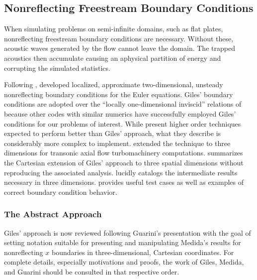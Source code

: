 \subsection{Nonreflecting Freestream Boundary Conditions}
\label{sec:nrbc}

When simulating problems on semi-infinite domains, such as flat plates,
nonreflecting freestream boundary conditions are necessary.  Without these,
acoustic waves generated by the flow cannot leave the domain.   The trapped
acoustics then accumulate causing an aphysical partition of energy and
corrupting the simulated statistics.

Following \citet{Engquist1977Absorbing},
\citet{Giles1988Nonreflecting,Giles1990Nonreflecting} developed localized,
approximate two-dimensional, unsteady nonreflecting boundary conditions for the
Euler equations.  Giles' boundary conditions are adopted over the ``locally
one-dimensional inviscid'' relations of \citet{Poinsot1992Boundary} because
other codes with similar numerics have successfully employed Giles' conditions
for our problems of interest.  While \citet{Rowley2000Discretely} present
higher order techniques expected to perform better than Giles' approach, what
they describe is considerably more complex to implement.
\citet{Saxer1993QuasiThreeDimensional} extended the technique to three
dimensions for transonic axial flow
turbomachinery computations.  \citet{Guarini1998} summarizes the Cartesian
extension of Giles' approach to three spatial dimensions without reproducing the
associated analysis.  \citet{Medida2007} lucidly catalogs the intermediate
results necessary in three dimensions.  \citet{Baum1995Accurate} provides useful
test cases as well as examples of correct boundary condition behavior.

\subsubsection{The Abstract Approach}
\label{sec:gilesabstract}

Giles' approach is now reviewed following Guarini's presentation with the goal of
setting notation suitable for presenting and manipulating Medida's results for
nonreflecting $x$ boundaries in three-dimensional, Cartesian coordinates.  For
complete details, especially motivations and proofs, the work of Giles, Medida,
and Guarini should be consulted in that respective order.

